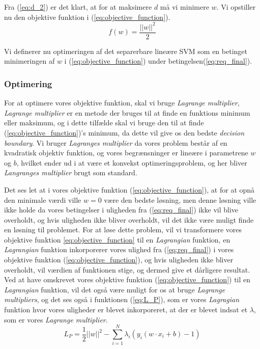 \documentclass{article}
\begin{document}
Fra (\ref{eq:d_2}) er det klart, at for at maksimere $d$ må vi minimere $w$. Vi opstiller nu den objektive funktion i (\ref{eq:objective_function}).
\begin{equation}
\label{eq:objective_function}
f(w)=\frac{||w||^2}{2}
\end{equation}

Vi definerer nu optimeringen af det separerbare lineære SVM som en betinget minimeringen af $w$ i (\ref{eq:objective_function}) under betingelsen(\ref{eq:req_final}).



\subsubsection{Optimering}
For at optimere vores objektive funktion, skal vi bruge \textit{Lagrange multiplier}, \textit{Lagrange multiplier} er en metode der bruges til at finde en funktions minimum eller maksimum, og i dette tilfælde skal vi bruge den til at finde (\ref{eq:objective_function})'s minimum, da dette vil give os den bedste \textit{decision boundary}. Vi bruger \textit{Lagranges multiplier} da vores problem består af en kvadratisk objektiv funktion, og vores begrænsninger er lineære i parametrene $w$ og $b$, hvilket ender ud i at være et konvekst optimeringsproblem, og her bliver \textit{Langranges multiplier} brugt som standard.

Det ses let at i vores objektive funktion (\ref{eq:objective_function}), at for at opnå den minimale værdi ville $w = 0$ være den bedste løsning, men denne løsning ville ikke holde da vores betingelser i uligheden fra (\ref{eq:req_final}) ikke vil blive overholdt, og hvis uligheden ikke bliver overholdt, vil det ikke være muligt finde en løsning til problemet. For at løse dette problem, vil vi transformere vores objektive funktion \ref{eq:objective_function} til en \textit{Lagrangian} funktion, en \textit{Lagrangian} funktion inkorporerer vores ulighed fra (\ref{eq:req_final}) i vores objektive funktion (\ref{eq:objective_function}), og hvis uligheden ikke bliver overholdt, vil værdien af funktionen stige, og dermed give et dårligere resultat. Ved at have omskrevet vores objektive funktion (\ref{eq:objective_function}) til en \textit{Lagrangian} funktion, vil det også være muligt for os at bruge \textit{Lagrange multipliers}, og det ses også i funktionen (\ref{eq:L_P}), som er vores \textit{Lagragian} funktion hvor vores uligheder er blevet inkorporeret, at der er blevet indsat et $\lambda$, som er vores \textit{Lagrange multiplier}.
\begin{equation}
\label{eq:L_P}
L_P = \frac{1}{2}||w||^2 - \sum\limits_{i=1}^N \lambda_i (y_i(w \cdot x_i + b) - 1)
\end{equation}
\end{document}

